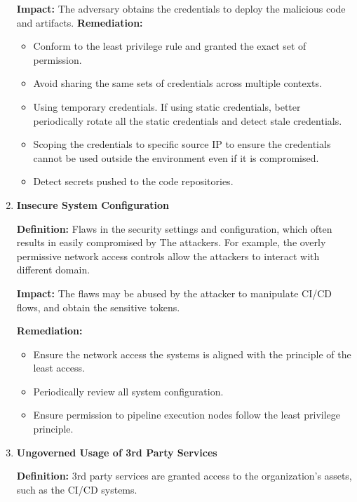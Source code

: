 \begin{enumerate}[label=(\arabic*)]
    \textbf{Impact: }
        The adversary obtains the credentials to deploy the malicious code and artifacts.
    \textbf{Remediation:}
        \begin{itemize}
            \item Conform to the least privilege rule and granted the exact set of permission.
            \item Avoid sharing the same sets of credentials across multiple contexts.
            \item Using temporary credentials. If using static credentials, better periodically rotate
            all the static credentials and detect stale credentials.
            \item Scoping the credentials to specific source IP to ensure the credentials cannot be used
            outside the environment even if it is compromised.
            \item Detect secrets pushed to the code repositories.
        \end{itemize}
    \item \textbf{Insecure System Configuration}

    \textbf{Definition: }
        Flaws in the security settings and configuration, which often results in easily compromised by The
        attackers. For example, the overly permissive network access controls allow the attackers to interact
        with different domain.

    \textbf{Impact: }
        The flaws may be abused by the attacker to manipulate CI/CD flows, and obtain the sensitive tokens.
    
    \textbf{Remediation:}
        \begin{itemize}
            \item Ensure the network access the systems is aligned with the principle of the least access.
            \item Periodically review all system configuration.
            \item Ensure permission to pipeline execution nodes follow the least privilege principle. 
        \end{itemize}
    \item \textbf{Ungoverned Usage of 3rd Party Services}

    \textbf{Definition: }   
        3rd party services are granted access to the organization's assets, such as the CI/CD systems.


\end{enumerate}
